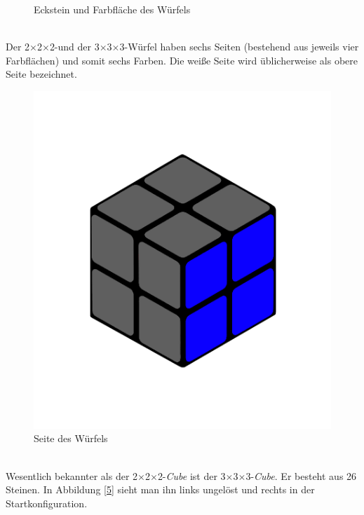 \documentclass[12pt,a4paper, usenames, dvipsnames]{article}
\newcommand{\Ttwo}{2$\times$2$\times$2-}
\newcommand{\Tthree}{3$\times$3$\times$3-}
\begin{document}
\begin{description}
\begin{figure}[h]
\caption[Eckstein und Farbfläche des Würfels]{Eckstein und Farbfläche des Würfels}
\label{4}
\end{figure} 


\newpage

\item[Seite] \ \\
Der \Ttwo und der \Tthree Würfel haben sechs Seiten (bestehend aus jeweils vier Farbflächen) und somit sechs Farben. Die weiße Seite wird üblicherweise als obere Seite bezeichnet. \\
\begin{figure}[h]
\centering
\includegraphics[scale=0.1]{2x2seite.png}
\caption[Seite des Würfels]{Seite des Würfels}
\end{figure}


\item[\Tthree Würfel] \ \\
Wesentlich bekannter als der \Ttwo \textit{Cube} ist der \Tthree \textit{Cube}. Er besteht aus 26 Steinen. In Abbildung \ref{5} sieht man ihn links ungelöst und rechts in der Startkonfiguration.


\end{description}
\end{document}
